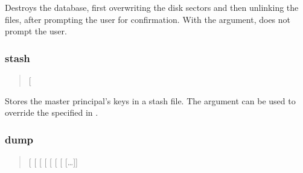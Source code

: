 \documentclass[letterpaper,10pt,english]{sphinxmanual}
\begin{document}
Destroys the database, first overwriting the disk sectors and then
unlinking the files, after prompting the user for confirmation.  With
the  argument, does not prompt the user.


\subsubsection{stash}
\label{\detokenize{admin/admin_commands/kdb5_util:kdb5-util-destroy-end}}\label{\detokenize{admin/admin_commands/kdb5_util:stash}}\label{\detokenize{admin/admin_commands/kdb5_util:kdb5-util-stash}}\begin{quote}

 {[} \sphinxstyleemphasis{keyfile}{]}
\end{quote}

Stores the master principal’s keys in a stash file.  The 
argument can be used to override the  specified in
{\hyperref[\detokenize{admin/conf_files/kdc_conf:kdc-conf-5}]{}}.


\subsubsection{dump}
\label{\detokenize{admin/admin_commands/kdb5_util:kdb5-util-stash-end}}\label{\detokenize{admin/admin_commands/kdb5_util:dump}}\label{\detokenize{admin/admin_commands/kdb5_util:kdb5-util-dump}}\begin{quote}

 {[}\textbar{}\textbar{}\sphinxstylestrong{-r18}{]}
{[}\sphinxstylestrong{-verbose}{]} {[}\sphinxstylestrong{-mkey\_convert}{]} {[}
\sphinxstyleemphasis{mkey\_file}{]} {[}\sphinxstylestrong{-rev}{]} {[}\sphinxstylestrong{-recurse}{]} {[}
{[}…{]}{]}
\end{quote}
\end{document}
